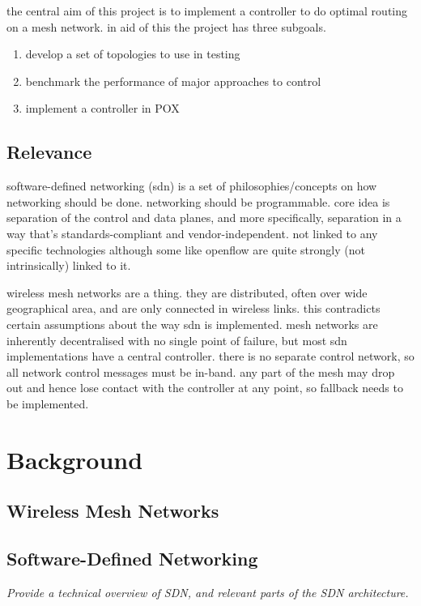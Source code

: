 \documentclass[pdftex,12pt,a4paper]{article}
\begin{document}
the central aim of this project is to implement a controller to do optimal routing on a mesh network. in aid of this the project has three subgoals.

\begin{enumerate}
\item develop a set of topologies to use in testing
\item benchmark the performance of major approaches to control
\item implement a controller in POX
\end{enumerate}

\subsection{Relevance}
software-defined networking (sdn) is a set of philosophies/concepts on how networking should be done. networking should be programmable. core idea is separation of the control and data planes, and more specifically, separation in a way that's standards-compliant and vendor-independent. \cite{onf:norm} not linked to any specific technologies although some like openflow are quite strongly (not intrinsically) linked to it. 

wireless mesh networks are a thing. they are distributed, often over wide geographical area, and are only connected in wireless links. this contradicts certain assumptions about the way sdn is implemented. mesh networks are inherently decentralised with no single point of failure, but most sdn implementations have a central controller. there is no separate control network, so all network control messages must be in-band. any part of the mesh may drop out and hence lose contact with the controller at any point, so fallback needs to be implemented.

\newpage
\section{Background}
\subsection{Wireless Mesh Networks}

\subsection{Software-Defined Networking}
\emph{Provide a technical overview of SDN, and relevant parts of the SDN architecture.}
\end{document}
